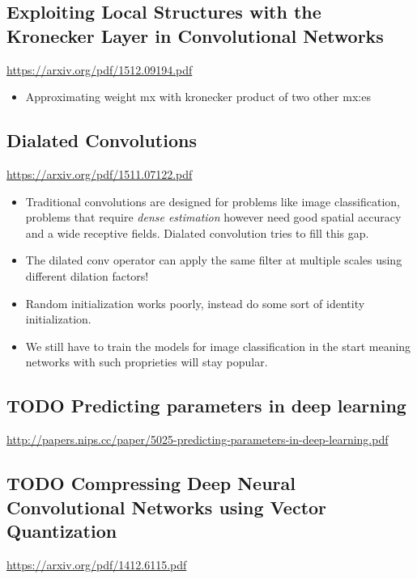 \documentclass[11pt]{article}
\begin{document}
\subsection{Exploiting Local Structures with the Kronecker Layer in Convolutional Networks}
\label{sec:orgf5c8090}
\url{https://arxiv.org/pdf/1512.09194.pdf}

\begin{itemize}
\item Approximating weight mx with kronecker product of two other mx:es
\end{itemize}

\subsection{Dialated Convolutions}
\label{sec:org515f02e}
\url{https://arxiv.org/pdf/1511.07122.pdf}

\begin{itemize}
\item Traditional convolutions are designed for problems like image classification, problems that require \emph{dense estimation} however need good spatial accuracy and a wide receptive fields. Dialated convolution tries to fill this gap.
\item The dilated conv operator can apply the same filter at multiple scales using different dilation factors!
\item Random initialization works poorly, instead do some sort of identity initialization.
\item We still have to train the models for image classification in the start meaning networks with such proprieties will stay popular.
\end{itemize}

\subsection{{\bfseries\sffamily TODO} Predicting parameters in deep learning}
\label{sec:orgdad2c23}
\url{http://papers.nips.cc/paper/5025-predicting-parameters-in-deep-learning.pdf}

\subsection{{\bfseries\sffamily TODO} Compressing Deep Neural Convolutional Networks using Vector Quantization}
\label{sec:org67f0d35}
\url{https://arxiv.org/pdf/1412.6115.pdf}
\end{document}
